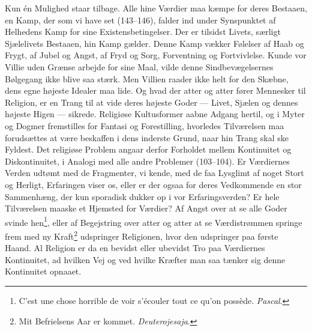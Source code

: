 \documentclass[12pt,a4paper]{book}
\newcommand{\apage}[1]{\marginnote{\footnotesize\textit{[#1]}}}
\begin{document}
Kun én Mulighed staar tilbage. Alle hine Værdier maa kæmpe for deres Bestaaen, en Kamp, der
som vi have set (143--146), falder ind under Synspunktet af Helhedens Kamp for sine
Existensbetingelser. Der er tilsidst Livets, særligt Sjælelivets Bestaaen, hin Kamp gælder.
Denne Kamp vækker Følelser af Haab og Frygt, af Jubel og Angst, af Fryd og Sorg, Forventning
og Fortvivlelse. Kunde vor Villie uden Grænse arbejde for sine Maal, vilde denne
Sindbevægelsernes Bølgegang ikke blive saa stærk. Men Villien raader ikke helt for den
Skæbne, dens egne højeste Idealer maa lide. Og hvad der atter og atter fører Mennesker til
Religion, er en Trang til at vide deres højeste Goder --- Livet, Sjælen og dennes højeste
Higen --- sikrede. Religiøse Kultusformer aabne Adgang hertil, og i Myter og Dogmer
fremstilles for Fantasi og Forestilling, hvorledes Tilværelsen maa forudsættes at være
beskaffen i dens inderste Grund, naar hin Trang skal ske Fyldest. Det religiøse Problem
angaar derfor Forholdet mellem Kontinuitet og Diskontinuitet, i Analogi med alle andre
Problemer (103--104). Er Værdiernes Verden udtømt med de Fragmenter, vi kende, med de faa
Lysglimt af noget Stort og Herligt, Erfaringen viser os, eller er der ogsaa for deres
Vedkommende en stor Sammenhæng, der kun sporadisk dukker op i vor Erfaringsverden? Er hele
Tilværelsen maaske et Hjemsted for Værdier? Af Angst over at se alle Goder svinde
hen\footnote{C'est une chose horrible de voir s'écouler tout ce qu'on possède. \emph{Pascal}.},
eller af Begejstring over atter og atter at se Værdistrømmen springe frem med ny
Kraft\footnote{Mit Befrielsens Aar er kommet. \emph{Deuterojesaja}.} udspringer Religionen,
hvor den udspringer paa første Haand. Al Religion er da en bevidst eller ubevidst Tro paa
Værdiernes \apage{376} Kontinuitet, ad hvilken Vej og ved hvilke Kræfter man saa tænker sig denne
Kontinuitet opnaaet.
\end{document}
